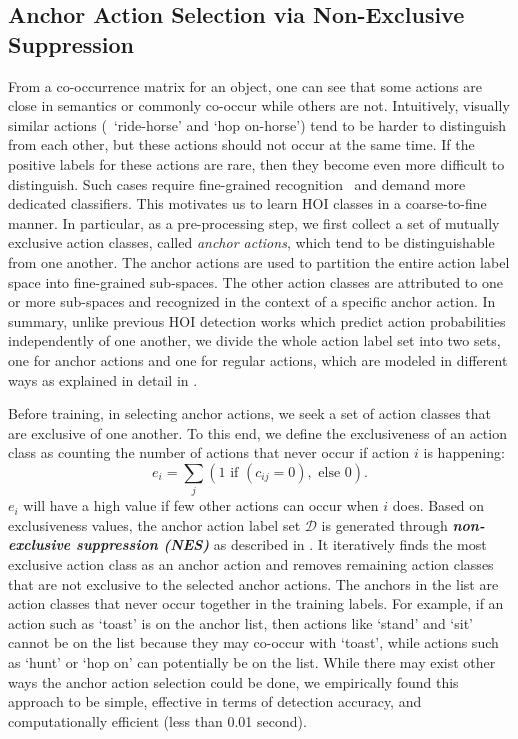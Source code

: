 \subsection{Anchor Action Selection via Non-Exclusive Suppression}
\label{sec.anchor}
{{From a co-occurrence matrix for an object, one can see that some actions are close in semantics or commonly co-occur while others are not. }}
Intuitively, 
visually similar actions (\eg~`ride-horse' and `hop on-horse')
tend to be harder to distinguish from each other, but these actions should not occur at the same time.
{If the positive labels for these actions are rare, then they become even more difficult to distinguish.}
Such cases require fine-grained recognition~\cite{fu2017look} and demand more dedicated classifiers.
This motivates us to learn HOI classes in a coarse-to-fine manner. 
In particular, as a pre-processing step, we first collect a set of mutually exclusive action {classes}, called \emph{anchor actions}, which tend to be distinguishable from one another. 
The anchor actions are used to partition the entire action {label} space into fine-grained sub-spaces. The other action {classes} are attributed to one or more sub-spaces and recognized in the context of a specific anchor action.
{In summary, unlike previous HOI detection works which predict action probabilities independently of one another, we divide the whole action label set into two sets, one for anchor actions and one for regular actions, which are modeled in different ways as explained in detail in }.








Before 
training, in selecting anchor actions, we seek a set of action {classes} that are exclusive of one another. To this end, we define the exclusiveness of an action {class} as counting the number of actions that never occur if action $i$ is happening: 
\begin{equation}
e_i = \sum_j ({1} \text{ if } (c_{ij} =0), \text{ else } {0}).
\label{eq:exclusiveness}
\end{equation}
$e_i$ will have a high value if few other actions can occur when $i$ does.
Based on exclusiveness values, the anchor action {label} set $\mathcal{D}$ is generated through \emph{\textbf{non-exclusive suppression (NES)}} as described in . It iteratively finds the most exclusive action {class} as an anchor action and removes remaining action {classes} that are not exclusive to the selected anchor actions. 
The anchors in the list are action {classes} that never occur together in the training labels. For example, if an action such as `toast' is on the anchor list, then actions like `stand' and `sit' cannot be on the list because they may co-occur with `toast', while actions such as `hunt' or `hop on' can potentially be on the list.
While there may exist other ways the anchor action selection could be done, we empirically found this approach to be simple, effective in terms of detection accuracy, and computationally efficient (less than 0.01 second).


